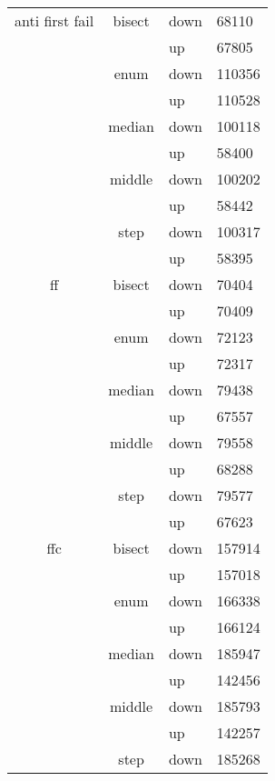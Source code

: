 \begin{longtable}{llll}
    \multicolumn{1}{c}{anti first fail} & \multicolumn{1}{c}{bisect} & down  & 68110 \\
          &       & up    & 67805 \\
          & \multicolumn{1}{c}{enum} & down  & 110356 \\
          &       & up    & 110528 \\
          & \multicolumn{1}{c}{median} & down  & 100118 \\
          &       & up    & 58400 \\
          & \multicolumn{1}{c}{middle} & down  & 100202 \\
          &       & up    & 58442 \\
          & \multicolumn{1}{c}{step} & down  & 100317 \\
          &       & up    & 58395 \\ \hline
    \multicolumn{1}{c}{ff} & \multicolumn{1}{c}{bisect} & down  & 70404 \\
          &       & up    & 70409 \\
          & \multicolumn{1}{c}{enum} & down  & 72123 \\
          &       & up    & 72317 \\
          & \multicolumn{1}{c}{median} & down  & 79438 \\
          &       & up    & 67557 \\
          & \multicolumn{1}{c}{middle} & down  & 79558 \\
          &       & up    & 68288 \\
          & \multicolumn{1}{c}{step} & down  & 79577 \\
          &       & up    & 67623 \\\hline
    \multicolumn{1}{c}{ffc} & \multicolumn{1}{c}{bisect} & down  & 157914 \\
          &       & up    & 157018 \\
          & \multicolumn{1}{c}{enum} & down  & 166338 \\
          &       & up    & 166124 \\
          & \multicolumn{1}{c}{median} & down  & 185947 \\
          &       & up    & 142456 \\
          & \multicolumn{1}{c}{middle} & down  & 185793 \\
          &       & up    & 142257 \\
          & \multicolumn{1}{c}{step} & down  & 185268 \\

\end{longtable}
